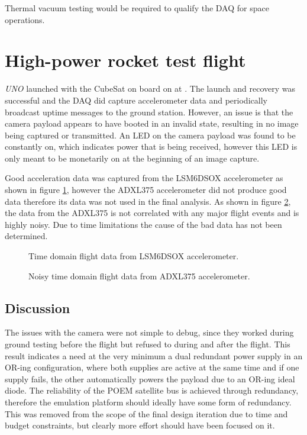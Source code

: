 \documentclass[]{report}
\begin{document}
Thermal vacuum testing would be required to qualify the DAQ for space operations.

\section{High-power rocket test flight}

\textit{UNO} launched with the CubeSat on board on  at . The launch and recovery was successful and the DAQ did capture accelerometer data and periodically broadcast uptime messages to the ground station. However, an issue is that the camera payload appears to have booted in an invalid state, resulting in no image being captured or transmitted. An LED on the camera payload was found to be constantly on, which indicates power that is being received, however this LED is only meant to be monetarily on at the beginning of an image capture.

Good acceleration data was captured from the LSM6DSOX accelerometer as shown in figure \ref{fig:flight-16g-time-domain}, however the ADXL375 accelerometer did not produce good data therefore its data was not used in the final analysis. As shown in figure \ref{fig:flight-200g-time-domain}, the data from the ADXL375 is not correlated with any major flight events and is highly noisy. Due to time limitations the cause of the bad data has not been determined.

\begin{figure}[H]
  \centering
  
  \caption{Time domain flight data from LSM6DSOX accelerometer.}
  \label{fig:flight-16g-time-domain}
\end{figure}

\begin{figure}[H]
  \centering
  
  \caption{Noisy time domain flight data from ADXL375 accelerometer.}
  \label{fig:flight-200g-time-domain}
\end{figure}

\subsection{Discussion}

The issues with the camera were not simple to debug, since they worked during ground testing before the flight but refused to during and after the flight. This result indicates a need at the very minimum a dual redundant power supply in an OR-ing configuration, where both supplies are active at the same time and if one supply fails, the other automatically powers the payload due to an OR-ing ideal diode. The reliability of the POEM satellite bus is achieved through redundancy, therefore the emulation platform should ideally have some form of redundancy. This was removed from the scope of the final design iteration due to time and budget constraints, but clearly more effort should have been focused on it.
\end{document}
